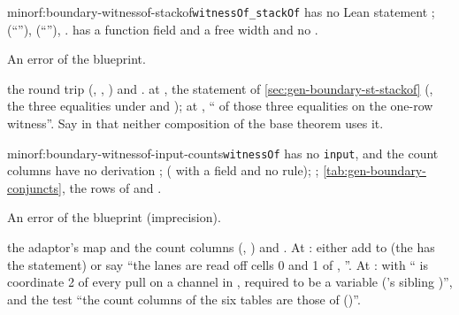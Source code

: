 \begin{finding}{minor}{f:boundary-witnessof-stackof}{\texttt{witnessOf\_stackOf} has no Lean statement}
 ; 
(\enquote{}), 
(\enquote{}), .  has a
function field and a free width and no .

 An error of the blueprint.

\begin{change}{the round trip (, , )}
\asis {}
and .
\asproposed at , the statement of \cref{sec:gen-boundary-st-stackof}
(, the three equalities under  and ); at
, \enquote{ of those three equalities on the one-row witness}. Say in
 that neither composition of the base theorem uses it.
\end{change}
\end{finding}

\begin{finding}{minor}{f:boundary-witnessof-input-counts}{\texttt{witnessOf} has no \texttt{input}, and the count columns have no derivation}
 ;  ( with a
 field and no rule); ; \cref{tab:gen-boundary-conjuncts}, the rows
of  and .

 An error of the blueprint (imprecision).

\begin{change}{the adaptor's map and the count columns (, )}
\asis {} and
.
\asproposed At : either add  to  (the
 has the statement) or say \enquote{the lanes are read off cells 0 and 1 of
, }. At :
 with \enquote{ is
coordinate 2 of every pull on a channel in , required to be a variable
('s sibling )}, and the test \enquote{the count columns of
the six tables are those of  ()}.
\end{change}
\end{finding}

